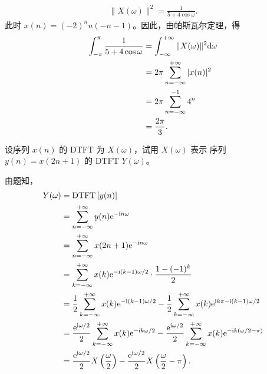 \begin{solution}
\begin{enumerate}[label=(\arabic*)]
\begin{align*}
                \|X(\omega)\|^2 = \frac{1}{5 + 4\cos\omega}.
            \end{align*}
            此时 $x(n) = (-2)^nu(-n-1)$。因此，由帕斯瓦尔定理，得
            \begin{align*}
                \int_{-\pi}^{\pi}\frac{1}{5 + 4\cos\omega} & = \int_{-\infty}^{+\infty}\|X(\omega)\|^2\mathrm{d}\omega \\
                & = 2\pi\sum_{n = -\infty}^{+\infty}|x(n)|^2 \\
                & = 2\pi\sum_{n = -\infty}^{-1}4^n \\
                & = \frac{2\pi}{3}.
            \end{align*}
    \end{enumerate}
\end{solution}

\begin{exercise}
    设序列 $x(n)$ 的 DTFT 为 $X(\omega)$，试用 $X(\omega)$ 表示
    序列 $y(n) = x(2n + 1)$ 的 DTFT $Y(\omega)$。
\end{exercise}

\begin{solution}
    由题知，
    \begin{align*}
        Y(\omega) & = \mathrm{DTFT}\left[y(n)\right] \\
        & = \sum_{n = -\infty}^{+\infty}y(n)\mathrm{e}^{-\mathrm{i} n\omega} \\
        & = \sum_{n = -\infty}^{+\infty}x(2n + 1)\mathrm{e}^{-\mathrm{i} n\omega} \\
        & = \sum_{k = -\infty}^{+\infty}x(k)\mathrm{e}^{-\mathrm{i} (k-1)\omega / 2} \cdot \frac{1 - (-1)^k}{2} \\
        & = \frac{1}{2}\sum_{k = -\infty}^{+\infty}x(k)\mathrm{e}^{-\mathrm{i} (k-1)\omega / 2}
            - \frac{1}{2}\sum_{k = -\infty}^{+\infty}x(k)\mathrm{e}^{\mathrm{i} k\pi -\mathrm{i} (k-1)\omega / 2} \\
        & = \frac{\mathrm{e}^{\mathrm{i}\omega/2}}{2}\sum_{k = -\infty}^{+\infty}x(k)\mathrm{e}^{-\mathrm{i} k \omega / 2}
            - \frac{\mathrm{e}^{\mathrm{i}\omega/2}}{2}\sum_{k = -\infty}^{+\infty}x(k)\mathrm{e}^{-\mathrm{i} k (\omega / 2 - \pi)} \\
        & = \frac{\mathrm{e}^{\mathrm{i}\omega/2}}{2}X\left(\frac{\omega}{2}\right)
            - \frac{\mathrm{e}^{\mathrm{i}\omega/2}}{2}X\left(\frac{\omega}{2} - \pi\right).
    \end{align*}
\end{solution}


